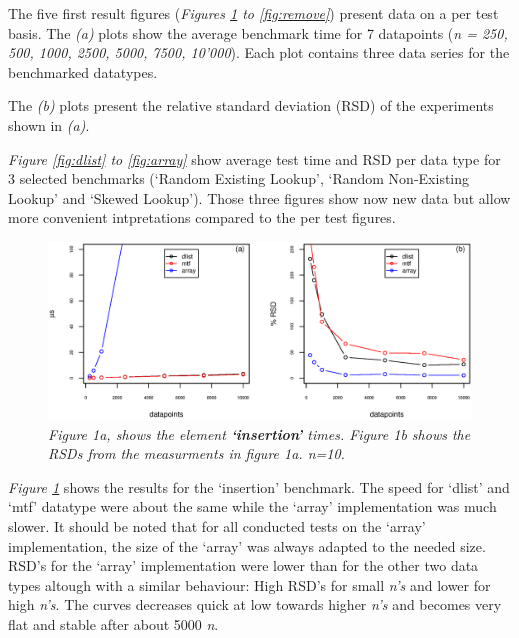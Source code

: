 \documentclass[a4paper,11pt,twoside]{article}
\begin{document}
The five first result figures (\textit{Figures \ref{fig:insertion} to
\ref{fig:remove}}) present data on a per test basis. The
\textit{(a)} plots show the average benchmark time for 7 datapoints 
(\textit{n = 250, 500, 1000, 2500, 5000, 7500, 10'000}). Each plot
contains three data series for the benchmarked datatypes.

The \textit{(b)} plots present the relative standard deviation (RSD)
of the experiments shown in \textit{(a)}. 

\textit{Figure \ref{fig:dlist} to \ref{fig:array}} show average test time and
RSD per data type for 3 selected benchmarks (`Random Existing Lookup',
`Random Non-Existing Lookup' and `Skewed Lookup'). Those three figures
show now new data but allow more convenient intpretations compared to
the per test figures.

\begin{figure}[H] 
\centering 
\includegraphics[width=\textwidth]{figures/fig1.eps}
\caption{\textit{Figure 1a, shows the element \textbf{`insertion'}
    times. Figure 1b shows the RSDs from the measurments in figure 1a. n=10.}}
\label{fig:insertion}
\end{figure}

\textit{Figure \ref{fig:insertion}} shows the results for the
`insertion' benchmark. The speed for `dlist' and `mtf' datatype were
about the same while the `array' implementation was much slower. It
should be noted that for all conducted tests on the `array'
implementation, the size of the `array' was always adapted to the
needed size. RSD's for the `array' implementation were lower than for
the other two data types altough with a similar behaviour: High RSD's 
for small \textit{n's} and lower for high \textit{n's}. The curves
decreases quick at low towards higher \textit{n's} and becomes very
flat and stable after about 5000 \textit{n}.
\end{document}
